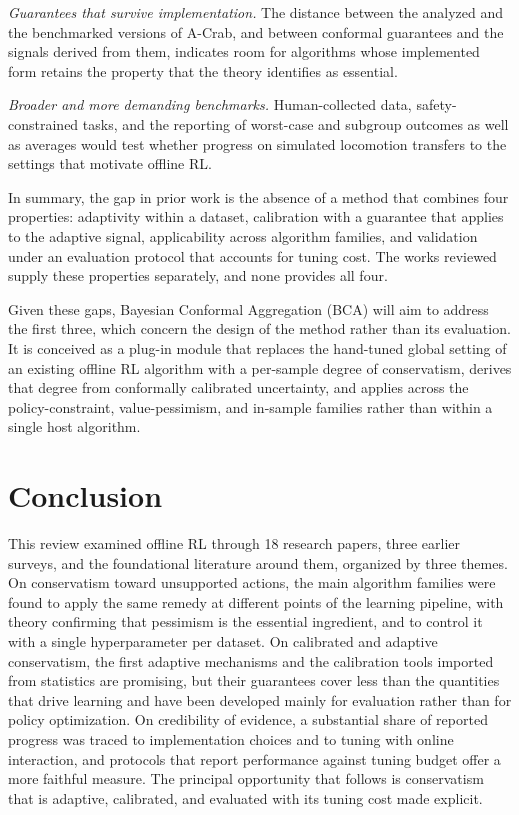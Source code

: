 \documentclass[conference]{IEEEtran}
\begin{document}
\emph{Guarantees that survive implementation.} The distance between the analyzed and the benchmarked versions of A-Crab, and between conformal guarantees and the signals derived from them, indicates room for algorithms whose implemented form retains the property that the theory identifies as essential.

\emph{Broader and more demanding benchmarks.} Human-collected data, safety-constrained tasks, and the reporting of worst-case and subgroup outcomes as well as averages would test whether progress on simulated locomotion transfers to the settings that motivate offline RL.

In summary, the gap in prior work is the absence of a method that combines four properties: adaptivity within a dataset, calibration with a guarantee that applies to the adaptive signal, applicability across algorithm families, and validation under an evaluation protocol that accounts for tuning cost. The works reviewed supply these properties separately, and none provides all four.

Given these gaps, Bayesian Conformal Aggregation (BCA) will aim to address the first three, which concern the design of the method rather than its evaluation. It is conceived as a plug-in module that replaces the hand-tuned global setting of an existing offline RL algorithm with a per-sample degree of conservatism, derives that degree from conformally calibrated uncertainty, and applies across the policy-constraint, value-pessimism, and in-sample families rather than within a single host algorithm.

\section{Conclusion}
\label{sec:conclusion}
This review examined offline RL through 18 research papers, three earlier surveys, and the foundational literature around them, organized by three themes. On conservatism toward unsupported actions, the main algorithm families were found to apply the same remedy at different points of the learning pipeline, with theory confirming that pessimism is the essential ingredient, and to control it with a single hyperparameter per dataset. On calibrated and adaptive conservatism, the first adaptive mechanisms and the calibration tools imported from statistics are promising, but their guarantees cover less than the quantities that drive learning and have been developed mainly for evaluation rather than for policy optimization. On credibility of evidence, a substantial share of reported progress was traced to implementation choices and to tuning with online interaction, and protocols that report performance against tuning budget offer a more faithful measure. The principal opportunity that follows is conservatism that is adaptive, calibrated, and evaluated with its tuning cost made explicit.
\end{document}
